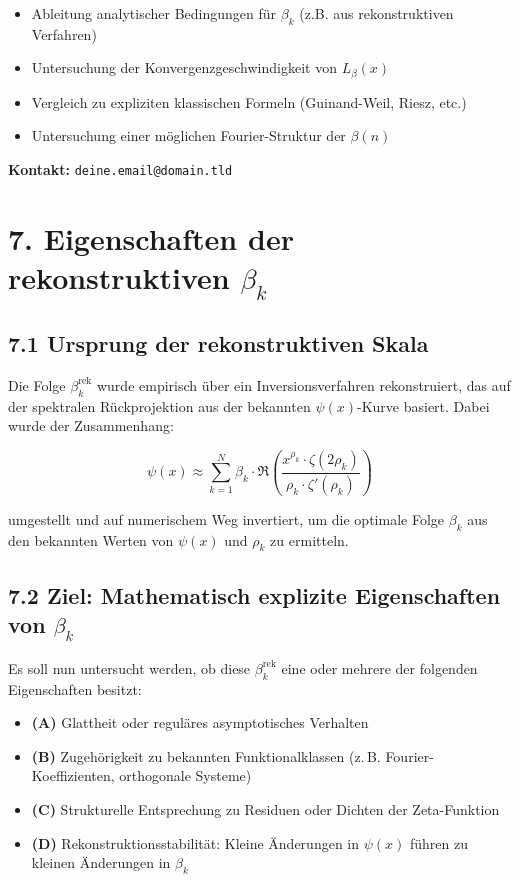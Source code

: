 \documentclass[12pt]{article}
\begin{document}
\begin{itemize}
    \item Ableitung analytischer Bedingungen für \(\beta_k\) (z.B. aus rekonstruktiven Verfahren)
    \item Untersuchung der Konvergenzgeschwindigkeit von \(L_\beta(x)\)
    \item Vergleich zu expliziten klassischen Formeln (Guinand-Weil, Riesz, etc.)
    \item Untersuchung einer möglichen Fourier-Struktur der \(\beta(n)\)
\end{itemize}

\vfill
\noindent\textbf{Kontakt:} \texttt{deine.email@domain.tld}

\section*{7. Eigenschaften der rekonstruktiven \(\beta_k\)}

\subsection*{7.1 Ursprung der rekonstruktiven Skala}

Die Folge \(\beta_k^{\text{rek}}\) wurde empirisch über ein Inversionsverfahren rekonstruiert, das auf der spektralen Rückprojektion aus der bekannten \(\psi(x)\)-Kurve basiert. Dabei wurde der Zusammenhang:

\[
\psi(x) \approx \sum_{k=1}^{N} \beta_k \cdot \Re \left( \frac{x^{\rho_k} \cdot \zeta(2\rho_k)}{\rho_k \cdot \zeta'(\rho_k)} \right)
\]

umgestellt und auf numerischem Weg invertiert, um die optimale Folge \(\beta_k\) aus den bekannten Werten von \(\psi(x)\) und \(\rho_k\) zu ermitteln.

\subsection*{7.2 Ziel: Mathematisch explizite Eigenschaften von \(\beta_k\)}

Es soll nun untersucht werden, ob diese \(\beta_k^{\text{rek}}\) eine oder mehrere der folgenden Eigenschaften besitzt:

\begin{itemize}
    \item \textbf{(A)} Glattheit oder reguläres asymptotisches Verhalten
    \item \textbf{(B)} Zugehörigkeit zu bekannten Funktionalklassen (z.\,B. Fourier-Koeffizienten, orthogonale Systeme)
    \item \textbf{(C)} Strukturelle Entsprechung zu Residuen oder Dichten der Zeta-Funktion
    \item \textbf{(D)} Rekonstruktionsstabilität: Kleine Änderungen in \(\psi(x)\) führen zu kleinen Änderungen in \(\beta_k\)
\end{itemize}
\end{document}
